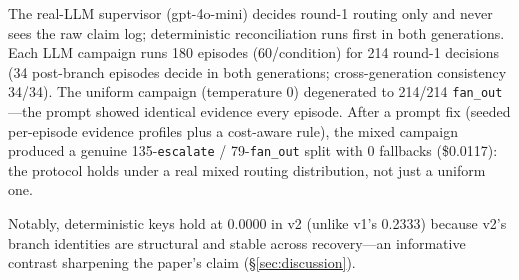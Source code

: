 \documentclass[10pt,journal,compsoc]{IEEEtran}
\begin{document}
\begin{table}[ht]
\centering
\caption{LangGraph v2: duplicate episodes by crash point
(60 episodes/condition). Crash-point \emph{distributions} are
matched across \emph{campaigns} (scripted/uniform/mixed) by
shared seed, not across \emph{conditions}---within one
campaign, the three conditions draw independent crash
realizations, so cross-condition comparisons are unpaired;
the table reports the mixed campaign.}
\label{tab:crashpoints}
\end{table}

The real-LLM supervisor (gpt-4o-mini) decides round-1 routing
only and never sees the raw claim log; deterministic
reconciliation runs first in both generations. Each LLM campaign
runs 180 episodes (60/condition) for 214 round-1 decisions
(34 post-branch episodes decide in both generations;
cross-generation consistency 34/34). The uniform campaign
(temperature 0) degenerated to 214/214 \texttt{fan\_out}---the
prompt showed identical evidence every episode. After a prompt
fix (seeded per-episode evidence profiles plus a cost-aware
rule), the mixed campaign produced a genuine
135-\texttt{escalate} / 79-\texttt{fan\_out} split with 0
fallbacks (\$0.0117): the protocol holds under a real mixed
routing distribution, not just a uniform one.

Notably, deterministic keys hold at 0.0000 in v2 (unlike v1's
0.2333) because v2's branch identities are structural and
stable across recovery---an informative contrast sharpening
the paper's claim (\S\ref{sec:discussion}).
\end{document}
